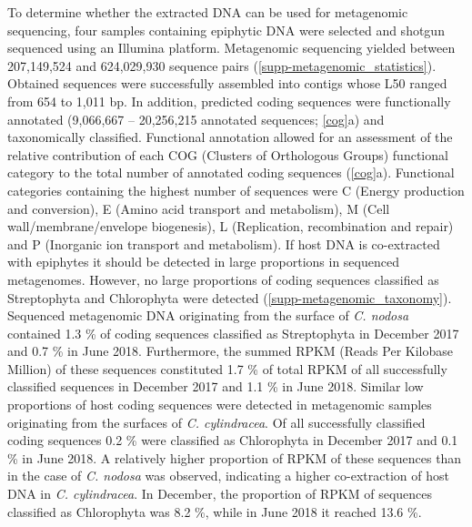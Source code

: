 \documentclass[12pt,]{article}
\begin{document}
To determine whether the extracted DNA can be used for metagenomic
sequencing, four samples containing epiphytic DNA were selected and
shotgun sequenced using an Illumina platform. Metagenomic sequencing
yielded between 207,149,524 and 624,029,930 sequence pairs
(\autoref{supp-metagenomic_statistics}). Obtained sequences were
successfully assembled into contigs whose L50 ranged from 654 to 1,011
bp. In addition, predicted coding sequences were functionally annotated
(9,066,667 -- 20,256,215 annotated sequences; \autoref{cog}a) and
taxonomically classified. Functional annotation allowed for an
assessment of the relative contribution of each COG (Clusters of
Orthologous Groups) functional category to the total number of annotated
coding sequences (\autoref{cog}a). Functional categories containing the
highest number of sequences were C (Energy production and conversion), E
(Amino acid transport and metabolism), M (Cell wall/membrane/envelope
biogenesis), L (Replication, recombination and repair) and P (Inorganic
ion transport and metabolism). If host DNA is co-extracted with
epiphytes it should be detected in large proportions in sequenced
metagenomes. However, no large proportions of coding sequences
classified as Streptophyta and Chlorophyta were detected
(\autoref{supp-metagenomic_taxonomy}). Sequenced metagenomic DNA
originating from the surface of \emph{C. nodosa} contained 1.3
\si{\percent} of coding sequences classified as Streptophyta in December
2017 and 0.7 \si{\percent} in June 2018. Furthermore, the summed RPKM
(Reads Per Kilobase Million) of these sequences constituted 1.7
\si{\percent} of total RPKM of all successfully classified sequences in
December 2017 and 1.1 \si{\percent} in June 2018. Similar low
proportions of host coding sequences were detected in metagenomic
samples originating from the surfaces of \emph{C. cylindracea}. Of all
successfully classified coding sequences 0.2 \si{\percent} were
classified as Chlorophyta in December 2017 and 0.1 \si{\percent} in June
2018. A relatively higher proportion of RPKM of these sequences than in
the case of \emph{C. nodosa} was observed, indicating a higher
co-extraction of host DNA in \emph{C. cylindracea}. In December, the
proportion of RPKM of sequences classified as Chlorophyta was 8.2
\si{\percent}, while in June 2018 it reached 13.6 \si{\percent}.
\end{document}
